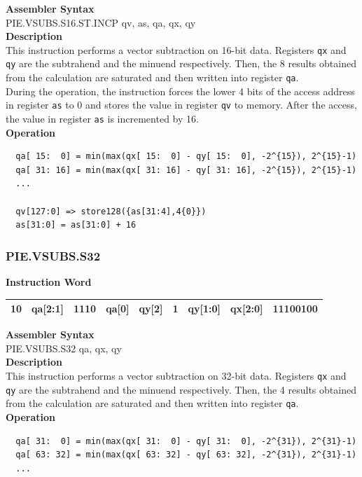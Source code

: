 \textbf{Assembler Syntax} \\
PIE.VSUBS.S16.ST.INCP qv, as, qa, qx, qy \\
\textbf{Description} \\
This instruction performs a vector subtraction on 16-bit data. Registers \lstinline{qx} and \lstinline{qy} are the subtrahend and the minuend respectively. Then, the 8 results obtained from the calculation are saturated and then written into register \lstinline{qa}. \\ During the operation, the instruction forces the lower 4 bits of the access address in register \lstinline{as} to 0 and stores the value in register \lstinline{qv} to memory. After the access, the value in register \lstinline{as} is incremented by 16.\\
\textbf{Operation}
\begin{lstlisting}
  qa[ 15:  0] = min(max(qx[ 15:  0] - qy[ 15:  0], -2^{15}), 2^{15}-1)
  qa[ 31: 16] = min(max(qx[ 31: 16] - qy[ 31: 16], -2^{15}), 2^{15}-1)
  ...

  qv[127:0] => store128({as[31:4],4{0}})
  as[31:0] = as[31:0] + 16
\end{lstlisting}

\newpage
\subsubsection{PIE.VSUBS.S32}\label{instruction:PIEVSUBSS32}
\setlength\tabcolsep{6pt}
\textbf{Instruction Word} \\
\begin{tabular}{|c|c|c|c|c|c|c|c|c|}
	\hline
	10 & qa[2:1] & 1110 & qa[0] & qy[2] & 1 & qy[1:0] & qx[2:0] & 11100100 \\
	\hline
\end{tabular}

\textbf{Assembler Syntax} \\
PIE.VSUBS.S32 qa, qx, qy \\
\textbf{Description} \\
This instruction performs a vector subtraction on 32-bit data. Registers \lstinline{qx} and \lstinline{qy} are the subtrahend and the minuend respectively. Then, the 4 results obtained from the calculation are saturated and then written into register \lstinline{qa}.\\
\textbf{Operation}
\begin{lstlisting}
  qa[ 31:  0] = min(max(qx[ 31:  0] - qy[ 31:  0], -2^{31}), 2^{31}-1)
  qa[ 63: 32] = min(max(qx[ 63: 32] - qy[ 63: 32], -2^{31}), 2^{31}-1)
  ...
\end{lstlisting}

